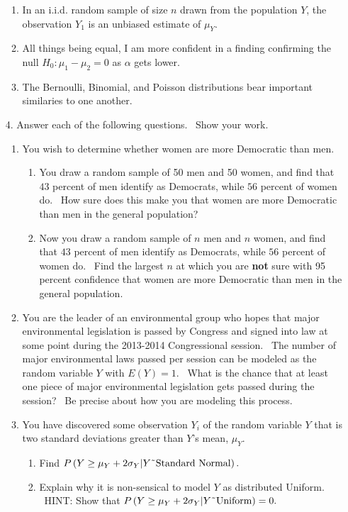 \documentclass[11pt]{article}
\begin{document}
\begin{enumerate}
\begin{enumerate}
\item In an i.i.d. random sample of size $n$ drawn from the population $Y$,
the observation $Y_{1}$ is an unbiased estimate of $\mu _{Y}.$

\item All things being equal, I am more confident in a finding confirming
the null $H_{0}:\mu _{1}-\mu _{2}=0$ as $\alpha $ gets lower.

\item The Bernoulli, Binomial, and Poisson distributions bear important
similaries to one another.\newpage
\end{enumerate}

\item[4.] Answer each of the following questions. \ Show your work. \ 

\begin{enumerate}
\item You wish to determine whether women are more Democratic than men. \ 

\begin{enumerate}
\item You draw a random sample of 50 men and 50 women, and find that $43$
percent of men identify as Democrats, while $56$ percent of women do. \ How
sure does this make you that women are more Democratic than men in the
general population?

\item Now you draw a random sample of $n$ men and $n$ women, and find that $%
43$ percent of men identify as Democrats, while $56$ percent of women do. \
Find the largest $n$ at which you are \textbf{not} sure with 95 percent
confidence that women are more Democratic than men in the general
population. \ \bigskip
\end{enumerate}

\item You are the leader of an environmental group who hopes that major
environmental legislation is passed by Congress and signed into law at some
point during the 2013-2014 Congressional session. \ The number of major
environmental laws passed per session can be modeled as the random variable $%
Y$ with $E\left( Y\right) =1.$ \ What is the chance that at least one piece
of major environmental legislation gets passed during the session? \ Be
precise about how you are modeling this process. \bigskip

\item You have discovered some observation $Y_{i}$ of the random variable $Y$
that is two standard deviations greater than $Y$'s mean, $\mu _{Y}.$ \ 

\begin{enumerate}
\item Find \thinspace $P\left( Y\geq \mu _{Y}+2\sigma _{Y}|Y\symbol{126}%
\text{Standard Normal}\right) .$

\item Explain why it is non-sensical to model $Y$ as distributed Uniform. \
HINT: Show that \thinspace $P\left( Y\geq \mu _{Y}+2\sigma _{Y}|Y\symbol{126}%
\text{Uniform}\right) =0.$
\end{enumerate}
\end{enumerate}
\end{enumerate}
\end{document}
